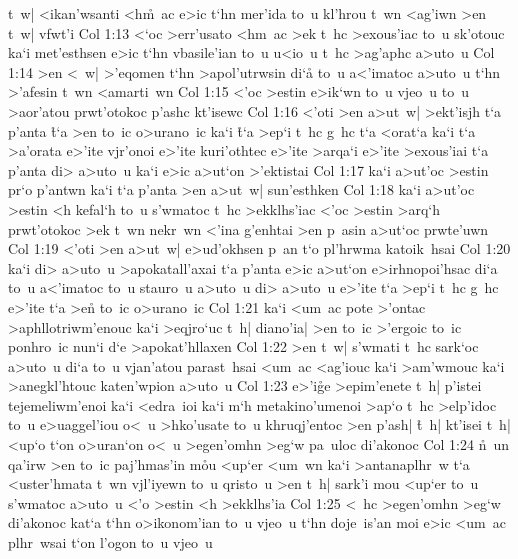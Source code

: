 t~w|
<ikan'wsanti
<h\r{m}~ac
e>ic
t`hn
mer'ida
to~u
kl'hrou
t~wn
<ag'iwn
>en
t~w|
vfwt'i\bibvsend
\vs Col 1:13
<`oc
>err'usato
<hm~ac
>ek
t~hc
>exous'iac
to~u
sk'otouc
ka`i
met'esthsen
e>ic
t`hn
vbasile'ian
to~u
u<io~u
t~hc
>ag'aphc
a>uto~u\bibvsend
\vs Col 1:14
>en
<~w|
>'eqomen
t`hn
>apol'utrwsin
di`a\r{}
to~u
a<'imatoc
a>uto~u
t`hn
>'afesin
t~wn
<amarti~wn\bibvsend
\vs Col 1:15
<'oc
>estin
e>ik`wn
to~u
vjeo~u
to~u
>aor'atou
prwt'otokoc
p'ashc
kt'isewc\bibvsend
\vs Col 1:16
<'oti
>en
a>ut~w|
>ekt'isjh
t`a
p'anta
\r{t}`a
>en
to~ic
o>urano~ic
ka`i
\r{t}`a
>ep`i
t~hc
g~hc
t`a
<orat`a
ka`i
t`a
>a'orata
e>'ite
vjr'onoi
e>'ite
kuri'othtec
e>'ite
>arqa`i
e>'ite
>exous'iai
t`a
p'anta
di>
a>uto~u
ka`i
e>ic
a>ut`on
>'ektistai\bibvsend
\vs Col 1:17
ka`i
a>ut'oc
>estin
pr`o
p'antwn
ka`i
t`a
p'anta
>en
a>ut~w|
sun'esthken\bibvsend
\vs Col 1:18
ka`i
a>ut'oc
>estin
<h
kefal`h
to~u
s'wmatoc
t~hc
>ekklhs'iac
<'oc
>estin
>arq`h
prwt'otokoc
>ek
t~wn
nekr~wn
<'ina
g'enhtai
>en
p~asin
a>ut`oc
prwte'uwn\bibvsend
\vs Col 1:19
<'oti
>en
a>ut~w|
e>ud'okhsen
p~an
t`o
pl'hrwma
katoik~hsai\bibvsend
\vs Col 1:20
ka`i
di>
a>uto~u
>apokatall'axai
t`a
p'anta
e>ic
a>ut`on
e>irhnopoi'hsac
di`a
to~u
a<'imatoc
to~u
stauro~u
a>uto~u
di>
a>uto~u
e>'ite
t`a
>ep`i
t~hc
g~hc
e>'ite
t`a
>e\r{n}
to~ic
o>urano~ic\bibvsend
\vs Col 1:21
ka`i
<um~ac
pote
>'ontac
>aphllotriwm'enouc
ka`i
>eqjro`uc
t~h|
diano'ia|
>en
to~ic
>'ergoic
to~ic
ponhro~ic
nun`i
d`e
>apokat'hllaxen\bibvsend
\vs Col 1:22
>en
t~w|
s'wmati
t~hc
sark`oc
a>uto~u
di`a
to~u
vjan'atou
parast~hsai
<um~ac
<ag'iouc
ka`i
>am'wmouc
ka`i
>anegkl'htouc
katen'wpion
a>uto~u\bibvsend
\vs Col 1:23
e>'i\r{g}e
>epim'enete
t~h|
p'istei
tejemeliwm'enoi
ka`i
<edra~ioi
ka`i
m`h
metakino'umenoi
>ap`o
t~hc
>elp'idoc
to~u
e>uaggel'iou
o<~u
>hko'usate
to~u
khruqj'entoc
>en
p'ash|
\r{t}~h|
kt'isei
t~h|
<up`o
t`on
o>uran`on
o<~u
>egen'omhn
>eg`w
pa~uloc
di'akonoc\bibvsend
\vs Col 1:24
\r{n}~un
qa'irw
>en
to~ic
paj'hmas'in
m\r{o}u
<up`er
<um~wn
ka`i
>antanaplhr~w
t`a
<uster'hmata
t~wn
vjl'iyewn
to~u
qristo~u
>en
t~h|
sark'i
mou
<up`er
to~u
s'wmatoc
a>uto~u
<'o
>estin
<h
>ekklhs'ia\bibvsend
\vs Col 1:25
<~hc
>egen'omhn
>eg`w
di'akonoc
kat`a
t`hn
o>ikonom'ian
to~u
vjeo~u
t`hn
doje~is'an
moi
e>ic
<um~ac
plhr~wsai
t`on
l'ogon
to~u
vjeo~u\bibvsend
